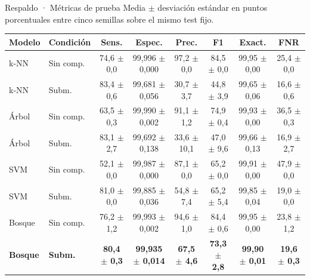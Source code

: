 \documentclass[aspectratio=169,10pt]{beamer}
\begin{document}
\begin{frame}{Respaldo · Métricas de prueba}
  \centering\scriptsize Media $\pm$ desviación estándar en puntos porcentuales entre cinco semillas sobre el mismo test fijo.
  \vspace{0.3cm}

  {\scriptsize
  \setlength{\tabcolsep}{3.7pt}
  \begin{tabular}{>{\raggedright\arraybackslash}p{2.0cm} >{\raggedright\arraybackslash}p{1.2cm} c c c c c c}
    \rowcolor{FraudPaleBlue}
    \toprule
    \textbf{Modelo} & \textbf{Condición} & \textbf{Sens.} & \textbf{Espec.} & \textbf{Prec.} & \textbf{F1} & \textbf{Exact.} & \textbf{FNR} \\
    \midrule
    k-NN & Sin comp. & 74,6 $\pm$ 0,0 & 99,996 $\pm$ 0,000 & 97,2 $\pm$ 0,0 & 84,5 $\pm$ 0,0 & 99,95 $\pm$ 0,00 & 25,4 $\pm$ 0,0 \\
    \rowcolor{FraudLightGray}
    k-NN & Subm. & 83,4 $\pm$ 0,6 & 99,681 $\pm$ 0,056 & 30,7 $\pm$ 3,7 & 44,8 $\pm$ 3,9 & 99,65 $\pm$ 0,06 & 16,6 $\pm$ 0,6 \\
    Árbol & Sin comp. & 63,5 $\pm$ 0,3 & 99,990 $\pm$ 0,002 & 91,1 $\pm$ 1,2 & 74,9 $\pm$ 0,4 & 99,93 $\pm$ 0,00 & 36,5 $\pm$ 0,3 \\
    \rowcolor{FraudLightGray}
    Árbol & Subm. & 83,1 $\pm$ 2,7 & 99,692 $\pm$ 0,138 & 33,6 $\pm$ 10,1 & 47,0 $\pm$ 9,6 & 99,66 $\pm$ 0,13 & 16,9 $\pm$ 2,7 \\
    SVM & Sin comp. & 52,1 $\pm$ 0,0 & 99,987 $\pm$ 0,000 & 87,1 $\pm$ 0,0 & 65,2 $\pm$ 0,0 & 99,91 $\pm$ 0,00 & 47,9 $\pm$ 0,0 \\
    \rowcolor{FraudLightGray}
    SVM & Subm. & 81,0 $\pm$ 0,0 & 99,885 $\pm$ 0,036 & 54,8 $\pm$ 7,4 & 65,2 $\pm$ 5,4 & 99,85 $\pm$ 0,04 & 19,0 $\pm$ 0,0 \\
    Bosque & Sin comp. & 76,2 $\pm$ 1,2 & 99,993 $\pm$ 0,002 & 94,6 $\pm$ 1,0 & 84,4 $\pm$ 0,6 & 99,95 $\pm$ 0,00 & 23,8 $\pm$ 1,2 \\
    \rowcolor{FraudPaleBlue}\textbf{Bosque} & \textbf{Subm.} & \textbf{80,4 $\pm$ 0,3} & \textbf{99,935 $\pm$ 0,014} & \textbf{67,5 $\pm$ 4,6} & \textbf{73,3 $\pm$ 2,8} & \textbf{99,90 $\pm$ 0,01} & \textbf{19,6 $\pm$ 0,3} \\
    \bottomrule
  \end{tabular}}
\end{frame}
\end{document}
